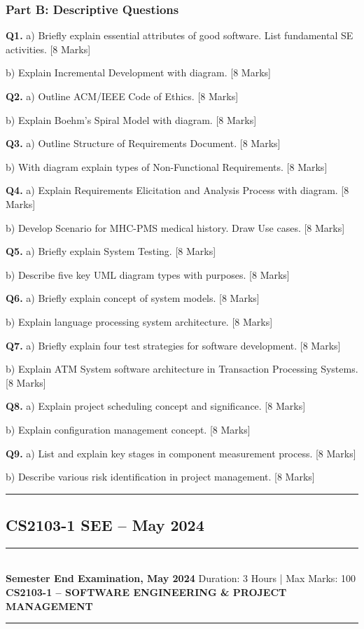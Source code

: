 \documentclass[11pt,a4paper]{article}
\newcommand{\examheader}[4]{
\noindent\rule{\textwidth}{0.5pt}\\
\textbf{#1} \hfill Duration: #3 | Max Marks: #4\\
\textbf{#2}\\
\rule{\textwidth}{0.5pt}
\vspace{0.2cm}
}
\begin{document}
\subsubsection*{Part B: Descriptive Questions}

\textbf{Q1.} a) Briefly explain essential attributes of good software. List fundamental SE activities. \hfill [8 Marks]

b) Explain Incremental Development with diagram. \hfill [8 Marks]

\textbf{Q2.} a) Outline ACM/IEEE Code of Ethics. \hfill [8 Marks]

b) Explain Boehm's Spiral Model with diagram. \hfill [8 Marks]

\textbf{Q3.} a) Outline Structure of Requirements Document. \hfill [8 Marks]

b) With diagram explain types of Non-Functional Requirements. \hfill [8 Marks]

\textbf{Q4.} a) Explain Requirements Elicitation and Analysis Process with diagram. \hfill [8 Marks]

b) Develop Scenario for MHC-PMS medical history. Draw Use cases. \hfill [8 Marks]

\textbf{Q5.} a) Briefly explain System Testing. \hfill [8 Marks]

b) Describe five key UML diagram types with purposes. \hfill [8 Marks]

\textbf{Q6.} a) Briefly explain concept of system models. \hfill [8 Marks]

b) Explain language processing system architecture. \hfill [8 Marks]

\textbf{Q7.} a) Briefly explain four test strategies for software development. \hfill [8 Marks]

b) Explain ATM System software architecture in Transaction Processing Systems. \hfill [8 Marks]

\textbf{Q8.} a) Explain project scheduling concept and significance. \hfill [8 Marks]

b) Explain configuration management concept. \hfill [8 Marks]

\textbf{Q9.} a) List and explain key stages in component measurement process. \hfill [8 Marks]

b) Describe various risk identification in project management. \hfill [8 Marks]

\vspace{0.5cm}
\hrule
\vspace{0.5cm}

\subsection{CS2103-1 SEE -- May 2024}
\examheader{Semester End Examination, May 2024}{CS2103-1 -- SOFTWARE ENGINEERING \& PROJECT MANAGEMENT}{3 Hours}{100}
\end{document}
